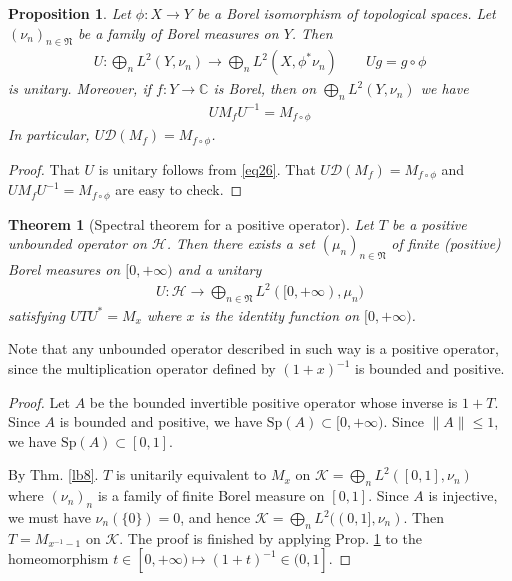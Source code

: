 \documentclass[12pt,b5paper,notitlepage]{article}
\theoremstyle{definition}
\theoremstyle{plain}
\newtheorem{thm}[df]{Theorem}
\newtheorem{pp}[df]{Proposition}
\newcommand{\fk}{\mathfrak}
\newcommand{\mc}{\mathcal}
\newcommand{\Dom}{\scr D}
\newcommand{\scr}{\mathscr}
\newcommand{\Cbb}{\mathbb C}
\newcommand{\Sp}{\mathrm{Sp}}
\numberwithin{equation}{section}
\begin{document}
\begin{pp}\label{lb70}
Let $\phi:X\rightarrow Y$ be a Borel isomorphism of topological spaces. Let $(\nu_n)_{n\in\fk N}$ be a family of Borel measures on $Y$. Then
\begin{gather*}
U:\bigoplus_nL^2(Y,\nu_n)\rightarrow \bigoplus_nL^2(X,\phi^*\nu_n)\qquad Ug=g\circ\phi
\end{gather*}
is unitary. Moreover, if $f:Y\rightarrow\Cbb$ is Borel, then on $\bigoplus_nL^2(Y,\nu_n)$ we have
\begin{align*}
UM_fU^{-1}=M_{f\circ\phi}
\end{align*}
In particular, $U\Dom(M_f)=M_{f\circ\phi}$.
\end{pp}


\begin{proof}
That $U$ is unitary follows from \eqref{eq26}. That $U\Dom(M_f)=M_{f\circ\phi}$ and $UM_fU^{-1}=M_{f\circ\phi}$ are easy to check.
\end{proof}




\begin{thm}[Spectral theorem for a positive operator]\label{lb14}
Let $T$ be a positive unbounded operator on $\mc H$. Then there exists a set $(\mu_n)_{n\in\fk N}$ of finite (positive) Borel measures on $[0,+\infty)$ and a unitary
\begin{align*}
	U:\mc H\rightarrow\bigoplus_{n\in\fk N} L^2([0,+\infty),\mu_n)
\end{align*}
satisfying $UTU^*=M_x$ where $x$ is the identity function on $[0,+\infty)$.
\end{thm}

Note that any unbounded operator described in such way is a positive operator, since the multiplication operator defined by $(1+x)^{-1}$ is bounded and positive.


\begin{proof}
Let $A$ be the bounded invertible positive operator whose inverse is $1+T$. Since $A$ is bounded and positive, we have $\Sp(A)\subset[0,+\infty)$. Since $\lVert A\lVert\leq 1$, we have $\Sp(A)\subset[0,1]$.  

By Thm. \ref{lb8}. $T$ is unitarily equivalent to $M_x$ on $\mc K=\bigoplus_n L^2([0,1],\nu_n)$ where $(\nu_n)_n$ is a family of finite Borel measure on $[0,1]$. Since $A$ is injective, we must have $\nu_n(\{0\})=0$, and hence $\mc K=\bigoplus_n L^2((0,1],\nu_n)$. Then $T=M_{x^{-1}-1}$ on $\mc K$. The proof is finished by applying Prop. \ref{lb70} to the homeomorphism $t\in[0,+\infty)\mapsto (1+t)^{-1}\in(0,1]$.
\end{proof}
\end{document}
